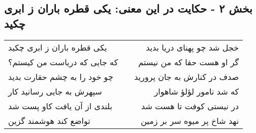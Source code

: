 \begin{center}
\section*{بخش ۲ - حکایت در این معنی: یکی قطره باران ز ابری چکید}
\label{sec:002}
\begin{longtable}{l p{0.5cm} r}
یکی قطره باران ز ابری چکید
&&
خجل شد چو پهنای دریا بدید
\\
که جایی که دریاست من کیستم؟
&&
گر او هست حقا که من نیستم
\\
چو خود را به چشم حقارت بدید
&&
صدف در کنارش به جان پرورید
\\
سپهرش به جایی رسانید کار
&&
که شد نامور لؤلؤ شاهوار
\\
بلندی از آن یافت کاو پست شد
&&
در نیستی کوفت تا هست شد
\\
تواضع کند هوشمند گزین
&&
نهد شاخ پر میوه سر بر زمین
\\
\end{longtable}
\end{center}

